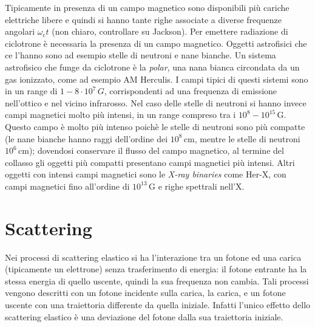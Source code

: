 Tipicamente in presenza di un campo magnetico sono disponibili più cariche elettriche libere e quindi si hanno tante righe associate a diverse frequenze angolari $\omega_\mathrm{c}t$ (non chiaro, controllare su Jackson). Per emettere radiazione di ciclotrone è necessaria la presenza di un campo magnetico. Oggetti astrofisici che ce l'hanno sono ad esempio stelle di neutroni e nane bianche. Un sistema astrofisico che funge da ciclotrone è la \textit{polar}, una nana bianca circondata da un gas ionizzato, come ad esempio AM Herculis. I campi tipici di questi sistemi sono in un range di $1 - 8\cdot 10^{7}\,G$, corrispondenti ad una frequenza di emissione nell'ottico e nel vicino infrarosso. Nel caso delle stelle di neutroni si hanno invece campi magnetici molto più intensi, in un range compreso tra i $10^8 - 10^{15} \, \mathrm{G}$. Questo campo è molto più intenso poichè le stelle di neutroni sono più compatte (le nane bianche hanno raggi dell'ordine dei $10^8 \, \mathrm{cm}$, mentre le stelle di neutroni $10^6 \, \mathrm{cm}$); dovendosi conservare il flusso del campo magnetico, al termine del collasso gli oggetti più compatti presentano campi magnetici più intensi. Altri oggetti con intensi campi magnetici sono le \textit{X-ray binaries} come Her-X, con campi magnetici fino all'ordine di $10^{13} \, \mathrm{G}$ e righe spettrali nell'X.

\section{Scattering}
Nei processi di scattering elastico si ha l'interazione tra un fotone ed una carica (tipicamente un elettrone) senza trasferimento di energia: il fotone entrante ha la stessa energia di quello uscente, quindi la sua frequenza non cambia. Tali processi vengono descritti con un fotone incidente sulla carica, la carica, e un fotone uscente con una traiettoria differente da quella iniziale. Infatti l'unico effetto dello scattering elastico è una deviazione del fotone dalla sua traiettoria iniziale.

